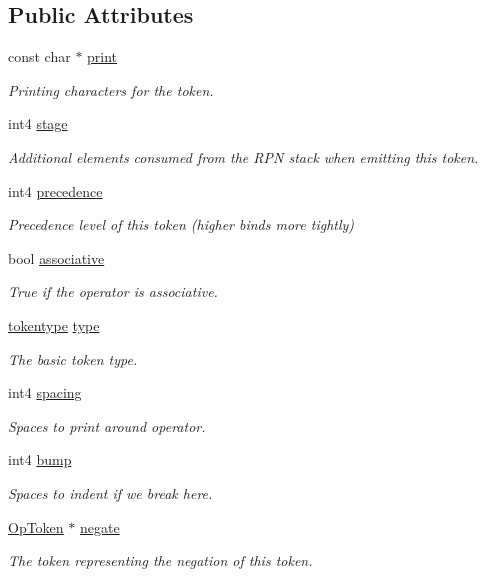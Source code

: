 \subsection*{Public Attributes}
\begin{DoxyCompactItemize}
\item 
const char $\ast$ \mbox{\hyperlink{class_op_token_a73d7c611fcdedb3eac4e74450def8561}{print}}
\begin{DoxyCompactList}\small\item\em Printing characters for the token. \end{DoxyCompactList}\item 
int4 \mbox{\hyperlink{class_op_token_a542686a26ddc09726ca70ec466d4f7f8}{stage}}
\begin{DoxyCompactList}\small\item\em Additional elements consumed from the R\+PN stack when emitting this token. \end{DoxyCompactList}\item 
int4 \mbox{\hyperlink{class_op_token_a6ce4a7a613c9ad8823cf7b25e917589d}{precedence}}
\begin{DoxyCompactList}\small\item\em Precedence level of this token (higher binds more tightly) \end{DoxyCompactList}\item 
bool \mbox{\hyperlink{class_op_token_a78b296119750390963ac1859bf447f52}{associative}}
\begin{DoxyCompactList}\small\item\em True if the operator is associative. \end{DoxyCompactList}\item 
\mbox{\hyperlink{class_op_token_af41c7f108d5662ede7765c5a6c44eaff}{tokentype}} \mbox{\hyperlink{class_op_token_a5669fe4bcabbd8afd66cc8b5d85c0f55}{type}}
\begin{DoxyCompactList}\small\item\em The basic token type. \end{DoxyCompactList}\item 
int4 \mbox{\hyperlink{class_op_token_a0e083c20738e711bc344f5ad8c824da5}{spacing}}
\begin{DoxyCompactList}\small\item\em Spaces to print around operator. \end{DoxyCompactList}\item 
int4 \mbox{\hyperlink{class_op_token_a0bb120db7eb448f0c1ead784548261b1}{bump}}
\begin{DoxyCompactList}\small\item\em Spaces to indent if we break here. \end{DoxyCompactList}\item 
\mbox{\hyperlink{class_op_token}{Op\+Token}} $\ast$ \mbox{\hyperlink{class_op_token_a7bb898ee28b397177f1a47bc2892c9fd}{negate}}
\begin{DoxyCompactList}\small\item\em The token representing the negation of this token. \end{DoxyCompactList}\end{DoxyCompactItemize}


